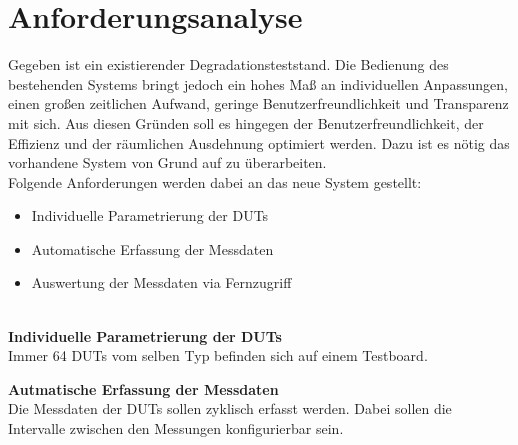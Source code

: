
\chapter{Anforderungsanalyse}
\label{chapter_Anforderungsanalyse}
Gegeben ist ein existierender Degradationsteststand. Die Bedienung des bestehenden Systems bringt jedoch ein hohes Maß an individuellen Anpassungen, einen großen zeitlichen Aufwand, geringe Benutzerfreundlichkeit und Transparenz mit sich. Aus diesen Gründen soll es hingegen der Benutzerfreundlichkeit, der Effizienz und der räumlichen Ausdehnung optimiert werden. Dazu ist es nötig das vorhandene System von Grund auf zu überarbeiten.\\

Folgende Anforderungen werden dabei an das neue System gestellt:
\begin{itemize}
\item Individuelle Parametrierung der \acp{DUT}
\item Automatische Erfassung der Messdaten
\item Auswertung der Messdaten via Fernzugriff
\end{itemize}
\ \\
\textbf{Individuelle Parametrierung der \acp{DUT}}\\
Immer 64 \acp{DUT} vom selben Typ befinden sich auf einem Testboard.

\textbf{Autmatische Erfassung der Messdaten}\\
Die Messdaten der \acp{DUT} sollen zyklisch erfasst werden. Dabei sollen die Intervalle zwischen den Messungen konfigurierbar sein. 
